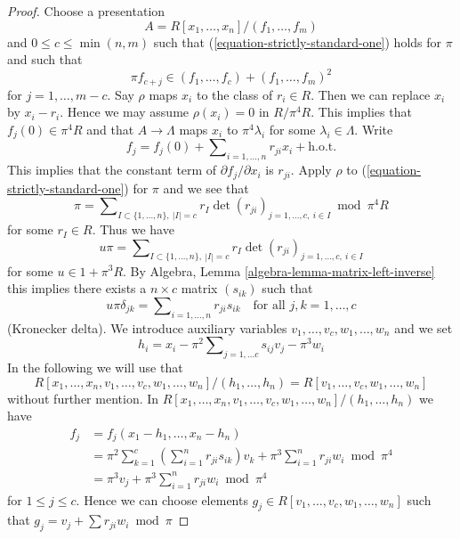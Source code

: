 \begin{proof}

Choose a presentation
$$
A = R[x_1, \ldots, x_n]/(f_1, \ldots, f_m)
$$
and $0 \leq c \leq \min(n, m)$ such that
(\ref{equation-strictly-standard-one}) holds for $\pi$ and such that
\begin{equation}
\label{equation-star}
\pi f_{c + j} \in (f_1, \ldots, f_c) + (f_1, \ldots, f_m)^2
\end{equation}
for $j = 1, \ldots, m - c$. Say $\rho$ maps $x_i$ to the class of
$r_i \in R$. Then we can replace $x_i$ by $x_i - r_i$. Hence we may
assume $\rho(x_i) = 0$ in $R/\pi^4 R$. This implies that
$f_j(0) \in \pi^4R$ and that $A \to \Lambda$ maps $x_i$
to $\pi^4\lambda_i$ for some $\lambda_i \in \Lambda$. Write
$$
f_j = f_j(0) + \sum\nolimits_{i = 1, \ldots, n} r_{ji} x_i + \text{h.o.t.}
$$
This implies that the constant term of $\partial f_j/\partial x_i$ is
$r_{ji}$. Apply $\rho$ to (\ref{equation-strictly-standard-one})
for $\pi$ and we see that
$$
\pi = \sum\nolimits_{I \subset \{1, \ldots, n\},\ |I| = c}
r_I \det(r_{ji})_{j = 1, \ldots, c,\ i \in I} \bmod \pi^4R
$$
for some $r_I \in R$. Thus we have
$$
u\pi = \sum\nolimits_{I \subset \{1, \ldots, n\},\ |I| = c}
r_I \det(r_{ji})_{j = 1, \ldots, c,\ i \in I}
$$
for some $u \in 1 + \pi^3R$. By
Algebra, Lemma \ref{algebra-lemma-matrix-left-inverse}
this implies there exists a $n \times c$ matrix $(s_{ik})$ such that
$$
u\pi \delta_{jk} = \sum\nolimits_{i = 1, \ldots, n} r_{ji}s_{ik}\quad
\text{for all } j, k = 1, \ldots, c
$$
(Kronecker delta). We introduce auxiliary variables
$v_1, \ldots, v_c, w_1, \ldots, w_n$ and we set
$$
h_i = x_i - \pi^2 \sum\nolimits_{j = 1, \ldots c} s_{ij} v_j - \pi^3 w_i
$$
In the following we will use that
$$
R[x_1, \ldots, x_n, v_1, \ldots, v_c, w_1, \ldots, w_n]/
(h_1, \ldots, h_n) = R[v_1, \ldots, v_c, w_1, \ldots, w_n]
$$
without further mention. In
$R[x_1, \ldots, x_n, v_1, \ldots, v_c, w_1, \ldots, w_n]/
(h_1, \ldots, h_n)$ we have
\begin{align*}
f_j & = f_j(x_1 - h_1, \ldots, x_n - h_n) \\
& =
\pi^2 \sum\nolimits_{k = 1}^c
\left(\sum\nolimits_{i = 1}^n r_{ji} s_{ik}\right) v_k
+
\pi^3 \sum\nolimits_{i = 1}^n r_{ji}w_i \bmod \pi^4 \\
& =
\pi^3 v_j + \pi^3 \sum\nolimits_{i = 1}^n r_{ji}w_i \bmod \pi^4
\end{align*}
for $1 \leq j \leq c$. Hence we can choose elements
$g_j \in R[v_1, \ldots, v_c, w_1, \ldots, w_n]$
such that $g_j = v_j + \sum r_{ji}w_i \bmod \pi$

\end{proof}
